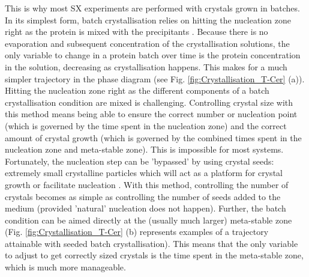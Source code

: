 This is why most SX experiments are performed with crystals grown in batches. In its simplest form, batch crystallisation relies on hitting the nucleation zone right as the protein is mixed with the precipitants \parencite{mcphersonPreparationAnalysisProtein1982}. Because there is no evaporation and subsequent concentration of the crystallisation solutions, the only variable to change in a protein batch over time is the protein concentration in the solution, decreasing as crystallisation happens. This makes for a much simpler trajectory in the phase diagram (see Fig. \ref{fig:Crystallisation_T-Cer} (a)).
Hitting the nucleation zone right as the different components of a batch crystallisation condition are mixed is challenging. Controlling crystal size with this method means being able to ensure the correct number or nucleation point (which is governed by the time spent in the nucleation zone) and the correct amount of crystal growth (which is governed by the combined times spent in the nucleation zone and meta-stable zone). This is impossible for most systems. Fortunately, the nucleation step can be 'bypassed' by using crystal seeds: extremely small crystalline particles which will act as a platform for crystal growth or facilitate nucleation \parencite{mcphersonPreparationAnalysisProtein1982,bergforsSeedsCrystals2003}. With this method, controlling the number of crystals becomes as simple as controlling the number of seeds added to the medium (provided 'natural' nucleation does not happen). Further, the batch condition can be aimed directly at the (usually much larger) meta-stable zone (Fig. \ref{fig:Crystallisation_T-Cer} (b) represents examples of a trajectory attainable with seeded batch crystallisation). This means that the only variable to adjust to get correctly sized crystals is the time spent in the meta-stable zone, which is much more manageable. 
